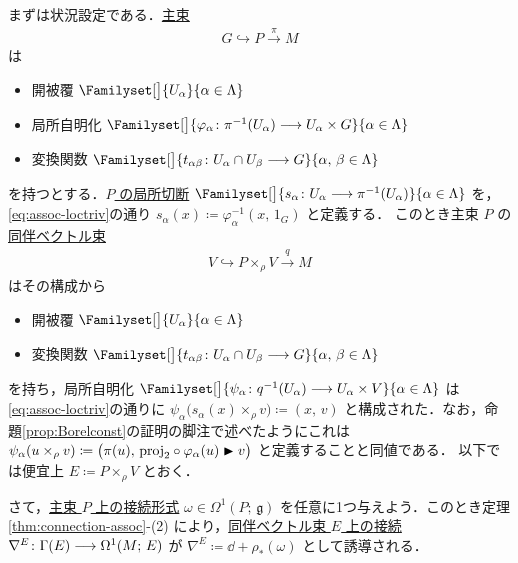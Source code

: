 \documentclass[TQFT_main]{subfiles}
\begin{document}
まずは状況設定である．\hyperref[def.PFD]{主束}
\begin{align}
    G \hookrightarrow P \xrightarrow{\pi} M
\end{align}
は
\begin{itemize}
    \item 開被覆 $\Familyset[\big]{U_\alpha}{\alpha \in \Lambda}$
    \item 局所自明化 $\Familyset[\big]{\varphi_\alpha \colon \pi^{-1}(U_\alpha) \lto U_\alpha \times G}{\alpha \in \Lambda}$ 
    \item 変換関数 $\Familyset[\big]{t_{\alpha\beta} \colon U_\alpha \cap U_\beta \lto G}{\alpha,\, \beta \in \Lambda}$
\end{itemize}
を持つとする．\underline{$P$ の}\hyperref[def.section]{局所切断} $\Familyset[\big]{s_\alpha \colon U_\alpha \lto \pi^{-1}(U_\alpha)}{\alpha \in \Lambda}$ を，\eqref{eq:assoc-loctriv}の通り $s_\alpha (x) \coloneqq \varphi_\alpha^{-1}(x,\, 1_G)$ と定義する．
このとき主束 $P$ の\hyperref[def:associated-vect]{同伴ベクトル束}
\begin{align}
    V \hookrightarrow P \times_\rho V \xrightarrow{q} M
\end{align}
はその構成から
\begin{itemize}
    \item 開被覆 $\Familyset[\big]{U_\alpha}{\alpha \in \Lambda}$
    \item 変換関数 $\Familyset[\big]{t_{\alpha\beta} \colon U_\alpha \cap U_\beta \lto G}{\alpha,\, \beta \in \Lambda}$
\end{itemize}
を持ち，局所自明化 $\Familyset[\big]{\psi_\alpha \colon q^{-1}(U_\alpha) \lto U_\alpha \times V}{\alpha \in \Lambda}$ は\eqref{eq:assoc-loctriv}の通りに $\psi_\alpha \bigl( s_\alpha(x) \times_\rho v \bigr) \coloneqq (x,\, v)$ と構成された．なお，命題\ref{prop:Borelconst}の証明の脚注で述べたようにこれは $\psi_\alpha(u \times_\rho v) \coloneqq \bigl( \pi(u),\, \mathrm{proj}_2 \circ \varphi_\alpha(u) \blacktriangleright v \bigr)$ と定義することと同値である．
以下では便宜上 $E \coloneqq P \times_\rho V$ とおく．

さて，\underline{主束 $P$ 上の}\hyperref[def:connection]{接続形式} $\omega \in \Omega^1(P;\, \mathfrak{g})$ を任意に1つ与えよう．このとき定理\ref{thm:connection-assoc}-(2) により，\underline{同伴ベクトル束 $E$ 上の}\hyperref[def:connection-vect]{接続} $\nabla^E \colon \Gamma(E) \longrightarrow \Omega^1(M;\, E)$ が $\nabla^E \coloneqq \dd + \rho_* (\omega)$ として誘導される．
\end{document}
